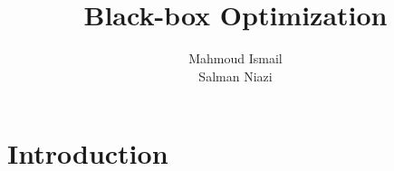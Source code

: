 \documentclass[12pt,a4paper]{article}
\begin{document}
\author{Mahmoud Ismail \\ Salman Niazi}
\title{\textbf{Black-box Optimization}}

\maketitle

\newpage
\section{Introduction}

\clearpage


\end{document}
